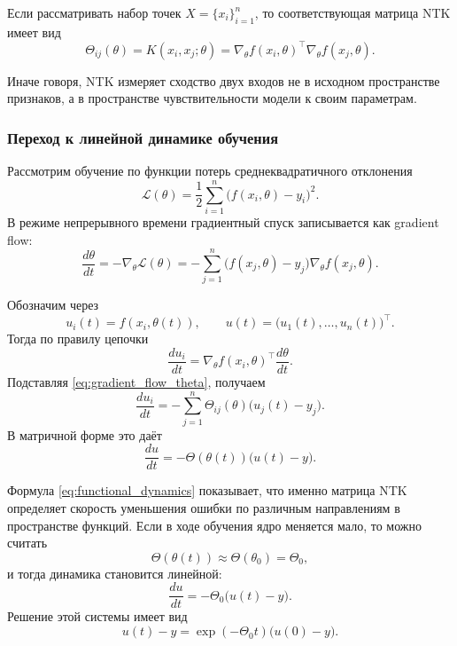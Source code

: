 Если рассматривать набор точек $X=\{x_i\}_{i=1}^{n}$, то соответствующая матрица NTK имеет вид
\begin{equation}
    \Theta_{ij}(\theta)=K(x_i,x_j;\theta)=\nabla_{\theta} f(x_i,\theta)^{\top}\nabla_{\theta} f(x_j,\theta).
    \label{eq:ntk_matrix}
\end{equation}

Иначе говоря, NTK измеряет сходство двух входов не в исходном пространстве признаков, а в пространстве чувствительности модели к своим параметрам.

\subsubsection{Переход к линейной динамике обучения}

Рассмотрим обучение по функции потерь среднеквадратичного отклонения
\begin{equation}
    \mathcal{L}(\theta)=\frac{1}{2}\sum_{i=1}^{n}\bigl(f(x_i,\theta)-y_i\bigr)^2.
\end{equation}
В режиме непрерывного времени градиентный спуск записывается как gradient flow:
\begin{equation}
    \frac{d\theta}{dt}=-\nabla_{\theta}\mathcal{L}(\theta)
    =-\sum_{j=1}^{n}\bigl(f(x_j,\theta)-y_j\bigr)\nabla_{\theta}f(x_j,\theta).
    \label{eq:gradient_flow_theta}
\end{equation}

Обозначим через
\begin{equation}
    u_i(t)=f(x_i,\theta(t)), \qquad u(t)=\bigl(u_1(t),\dots,u_n(t)\bigr)^{\top}.
\end{equation}
Тогда по правилу цепочки
\begin{equation}
    \frac{du_i}{dt}
    =\nabla_{\theta}f(x_i,\theta)^{\top}\frac{d\theta}{dt}.
\end{equation}
Подставляя \eqref{eq:gradient_flow_theta}, получаем
\begin{equation}
    \frac{du_i}{dt}
    =-\sum_{j=1}^{n}\Theta_{ij}(\theta)\bigl(u_j(t)-y_j\bigr).
\end{equation}
В матричной форме это даёт
\begin{equation}
    \frac{du}{dt}=-\Theta(\theta(t))\bigl(u(t)-y\bigr).
    \label{eq:functional_dynamics}
\end{equation}

Формула \eqref{eq:functional_dynamics} показывает, что именно матрица NTK определяет скорость уменьшения ошибки по различным направлениям в пространстве функций. Если в ходе обучения ядро меняется мало, то можно считать
\begin{equation}
    \Theta(\theta(t))\approx \Theta(\theta_0)=\Theta_0,
\end{equation}
и тогда динамика становится линейной:
\begin{equation}
    \frac{du}{dt}=-\Theta_0\bigl(u(t)-y\bigr).
\end{equation}
Решение этой системы имеет вид
\begin{equation}
    u(t)-y=\exp(-\Theta_0 t)\bigl(u(0)-y\bigr).
    \label{eq:matrix_exp_solution}
\end{equation}

